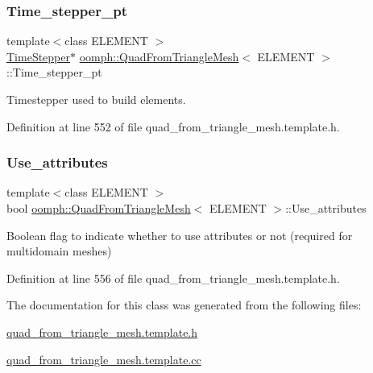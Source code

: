 \subsubsection{\texorpdfstring{Time\+\_\+stepper\+\_\+pt}{Time\_stepper\_pt}}
{\footnotesize\ttfamily template$<$class E\+L\+E\+M\+E\+NT $>$ \\
\hyperlink{classoomph_1_1TimeStepper}{Time\+Stepper}$\ast$ \hyperlink{classoomph_1_1QuadFromTriangleMesh}{oomph\+::\+Quad\+From\+Triangle\+Mesh}$<$ E\+L\+E\+M\+E\+NT $>$\+::Time\+\_\+stepper\+\_\+pt}



Timestepper used to build elements. 



Definition at line 552 of file quad\+\_\+from\+\_\+triangle\+\_\+mesh.\+template.\+h.

\mbox{\label{classoomph_1_1QuadFromTriangleMesh_ac654f77f031a4126e6e2707d1fa7dad1}} 
\subsubsection{\texorpdfstring{Use\+\_\+attributes}{Use\_attributes}}
{\footnotesize\ttfamily template$<$class E\+L\+E\+M\+E\+NT $>$ \\
bool \hyperlink{classoomph_1_1QuadFromTriangleMesh}{oomph\+::\+Quad\+From\+Triangle\+Mesh}$<$ E\+L\+E\+M\+E\+NT $>$\+::Use\+\_\+attributes}

Boolean flag to indicate whether to use attributes or not (required for multidomain meshes) 

Definition at line 556 of file quad\+\_\+from\+\_\+triangle\+\_\+mesh.\+template.\+h.



The documentation for this class was generated from the following files\+:\begin{DoxyCompactItemize}
\item 
\hyperlink{quad__from__triangle__mesh_8template_8h}{quad\+\_\+from\+\_\+triangle\+\_\+mesh.\+template.\+h}\item 
\hyperlink{quad__from__triangle__mesh_8template_8cc}{quad\+\_\+from\+\_\+triangle\+\_\+mesh.\+template.\+cc}\end{DoxyCompactItemize}
